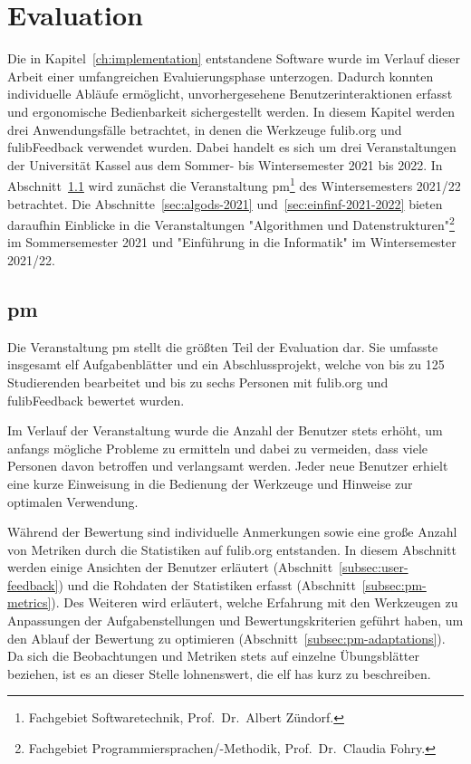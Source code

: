 \chapter{Evaluation}\label{ch:evaluation}

Die in Kapitel~\ref{ch:implementation} entstandene Software wurde im Verlauf dieser Arbeit einer umfangreichen Evaluierungsphase unterzogen.
Dadurch konnten individuelle Abläufe ermöglicht, unvorhergesehene Benutzerinteraktionen erfasst und ergonomische Bedienbarkeit sichergestellt werden.
In diesem Kapitel werden drei Anwendungsfälle betrachtet, in denen die Werkzeuge fulib.org und fulibFeedback verwendet wurden.
Dabei handelt es sich um drei Veranstaltungen der Universität Kassel aus dem Sommer- bis Wintersemester 2021 bis 2022.
In Abschnitt~\ref{sec:pm-2021-2022} wird zunächst die Veranstaltung \ac{pm}\footnote{
    Fachgebiet Softwaretechnik, Prof.\ Dr.\ Albert Zündorf.
} des Wintersemesters 2021/22 betrachtet.
Die Abschnitte~\ref{sec:algods-2021} und~\ref{sec:einfinf-2021-2022} bieten daraufhin Einblicke in die Veranstaltungen "Algorithmen und Datenstrukturen"\footnote{
    Fachgebiet Programmiersprachen/-Methodik, Prof.\ Dr.\ Claudia Fohry.\label{fn:fg-plm}
} im Sommersemester 2021 und "Einführung in die Informatik" im Wintersemester 2021/22.

\section{\acl{pm}}\label{sec:pm-2021-2022}

Die Veranstaltung \ac{pm} stellt die größten Teil der Evaluation dar.
Sie umfasste insgesamt elf Aufgabenblätter und ein Abschlussprojekt, welche von bis zu 125 Studierenden bearbeitet und bis zu sechs Personen mit fulib.org und fulibFeedback bewertet wurden.

Im Verlauf der Veranstaltung wurde die Anzahl der Benutzer stets erhöht, um anfangs mögliche Probleme zu ermitteln und dabei zu vermeiden, dass viele Personen davon betroffen und verlangsamt werden.
Jeder neue Benutzer erhielt eine kurze Einweisung in die Bedienung der Werkzeuge und Hinweise zur optimalen Verwendung.

Während der Bewertung sind individuelle Anmerkungen sowie eine große Anzahl von Metriken durch die Statistiken auf fulib.org entstanden.
In diesem Abschnitt werden einige Ansichten der Benutzer erläutert (Abschnitt~\ref{subsec:user-feedback}) und die Rohdaten der Statistiken erfasst (Abschnitt~\ref{subsec:pm-metrics}).
Des Weiteren wird erläutert, welche Erfahrung mit den Werkzeugen zu Anpassungen der Aufgabenstellungen und Bewertungskriterien geführt haben, um den Ablauf der Bewertung zu optimieren (Abschnitt~\ref{subsec:pm-adaptations}).
Da sich die Beobachtungen und Metriken stets auf einzelne Übungsblätter beziehen, ist es an dieser Stelle lohnenswert, die elf \acp{ha} kurz zu beschreiben.

